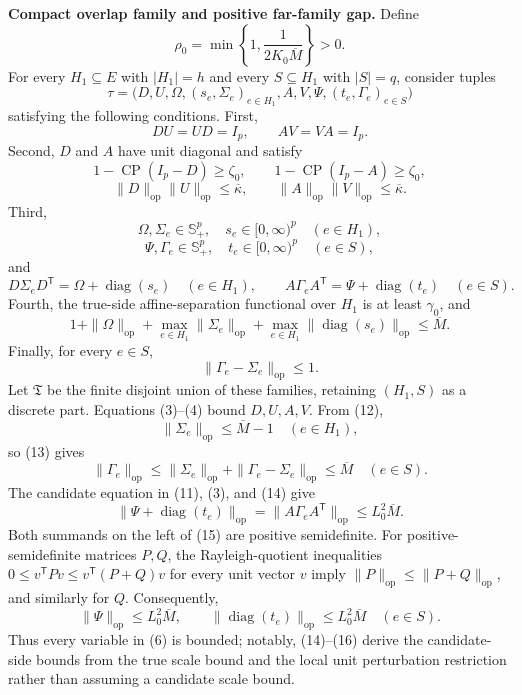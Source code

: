 \textbf{Compact overlap family and positive far-family gap.}
Define
\[
\rho_0=\min\left\{1,\frac{1}{2K_0\overline M}\right\}>0.
\tag{5}
\]
For every \(H_1\subseteq E\) with \(|H_1|=h\) and every \(S\subseteq H_1\) with \(|S|=q\), consider tuples
\[
\tau=\bigl(D,U,\Omega,(s_e,\Sigma_e)_{e\in H_1},
A,V,\Psi,(t_e,\Gamma_e)_{e\in S}\bigr)
\tag{6}
\]
satisfying the following conditions. First,
\[
DU=UD=I_p,
\qquad
AV=VA=I_p.
\tag{7}
\]
Second, \(D\) and \(A\) have unit diagonal and satisfy
\[
1-\operatorname{CP}(I_p-D)\geq\zeta_0,
\qquad
1-\operatorname{CP}(I_p-A)\geq\zeta_0,
\tag{8}
\]
\[
\|D\|_{\mathrm{op}}\|U\|_{\mathrm{op}}
\leq\overline\kappa,
\qquad
\|A\|_{\mathrm{op}}\|V\|_{\mathrm{op}}
\leq\overline\kappa.
\tag{9}
\]
Third,
\[
\Omega,\Sigma_e\in\mathbb S_+^p,\quad
s_e\in[0,\infty)^p\quad(e\in H_1),
\]
\[
\Psi,\Gamma_e\in\mathbb S_+^p,\quad
t_e\in[0,\infty)^p\quad(e\in S),
\tag{10}
\]
and
\[
D\Sigma_eD^{\mathsf T}=\Omega+\operatorname{diag}(s_e)
\quad(e\in H_1),
\qquad
A\Gamma_eA^{\mathsf T}=\Psi+\operatorname{diag}(t_e)
\quad(e\in S).
\tag{11}
\]
Fourth, the true-side affine-separation functional over \(H_1\) is at least \(\gamma_0\), and
\[
1+\|\Omega\|_{\mathrm{op}}
+\max_{e\in H_1}\|\Sigma_e\|_{\mathrm{op}}
+\max_{e\in H_1}\|\operatorname{diag}(s_e)\|_{\mathrm{op}}
\leq\overline M.
\tag{12}
\]
Finally, for every \(e\in S\),
\[
\|\Gamma_e-\Sigma_e\|_{\mathrm{op}}\leq1.
\tag{13}
\]
Let \(\mathfrak T\) be the finite disjoint union of these families, retaining \((H_1,S)\) as a discrete part. Equations (3)--(4) bound \(D,U,A,V\). From (12),
\[
\|\Sigma_e\|_{\mathrm{op}}\leq\overline M-1
\quad(e\in H_1),
\]
so (13) gives
\[
\|\Gamma_e\|_{\mathrm{op}}
\leq\|\Sigma_e\|_{\mathrm{op}}
+\|\Gamma_e-\Sigma_e\|_{\mathrm{op}}
\leq\overline M
\quad(e\in S).
\tag{14}
\]
The candidate equation in (11), (3), and (14) give
\[
\|\Psi+\operatorname{diag}(t_e)\|_{\mathrm{op}}
=\|A\Gamma_eA^{\mathsf T}\|_{\mathrm{op}}
\leq L_0^2\overline M.
\tag{15}
\]
Both summands on the left of (15) are positive semidefinite. For positive-semidefinite matrices \(P,Q\), the Rayleigh-quotient inequalities \(0\leq v^{\mathsf T}Pv\leq v^{\mathsf T}(P+Q)v\) for every unit vector \(v\) imply \(\|P\|_{\mathrm{op}}\leq\|P+Q\|_{\mathrm{op}}\), and similarly for \(Q\). Consequently,
\[
\|\Psi\|_{\mathrm{op}}
\leq L_0^2\overline M,
\qquad
\|\operatorname{diag}(t_e)\|_{\mathrm{op}}
\leq L_0^2\overline M
\quad(e\in S).
\tag{16}
\]
Thus every variable in (6) is bounded; notably, (14)--(16) derive the candidate-side bounds from the true scale bound and the local unit perturbation restriction rather than assuming a candidate scale bound.

